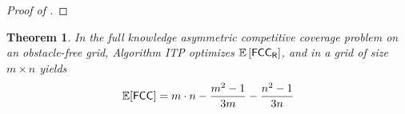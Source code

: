 \documentclass[letterpaper, 10 pt, conference]{ieeeconf}  %
\newtheorem{theorem}{Theorem}
\theoremstyle{definition}
\newcommand{\rob}{{{\sf R}}\xspace}
\newcommand{\fcc}{{{\sf{FCC}}}\xspace}
\newcommand{\itp}{{{\textsf{ITP}}}\xspace}
\DeclarePairedDelimiter\abs{\lvert}{\rvert}%
\begin{document}
\begin{proof}[Proof of ]

\end{proof}


\begin{theorem}\label{theorems: itp optimality expected fcc}
In the full knowledge asymmetric competitive coverage problem on an obstacle-free grid, Algorithm \itp optimizes $\mathbb{E}\left[\fcc_{\rob}\right]$, and in a grid of size $m\times n$ yields
\[\mathbb{E}[\fcc] = m\cdot n-\frac{m^2-1}{3m}-\frac{n^2-1}{3n}\]


\end{theorem}
\end{document}
